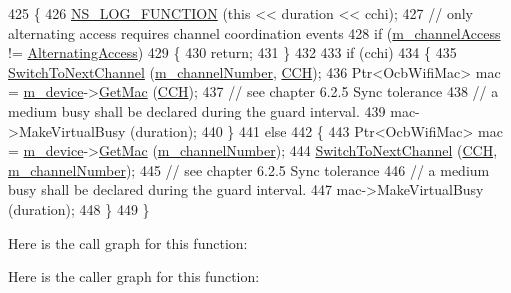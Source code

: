 \begin{DoxyCode}
425 \{
426   \hyperlink{log-macros-disabled_8h_a90b90d5bad1f39cb1b64923ea94c0761}{NS\_LOG\_FUNCTION} (\textcolor{keyword}{this} << duration << cchi);
427   \textcolor{comment}{// only alternating access requires channel coordination events}
428   \textcolor{keywordflow}{if} (\hyperlink{classns3_1_1DefaultChannelScheduler_a1316c42b27cfd480a0a2bf4f949f0402}{m\_channelAccess} != \hyperlink{namespacens3_a877f2f8d3767cc34993bce0739179781a5b36d54e91da429a2e16406e0eacb3a2}{AlternatingAccess})
429     \{
430       \textcolor{keywordflow}{return};
431     \}
432 
433   \textcolor{keywordflow}{if} (cchi)
434     \{
435       \hyperlink{classns3_1_1DefaultChannelScheduler_a661fb5bfff90527fa4be59820ccf8bdf}{SwitchToNextChannel} (\hyperlink{classns3_1_1DefaultChannelScheduler_ade2b5b6a517ae8cfaf6c476c422d0d41}{m\_channelNumber}, 
      \hyperlink{channel-manager_8h_a52d2f169cde2f6abe66ecc83f0d7ad80}{CCH});
436       Ptr<OcbWifiMac> mac = \hyperlink{classns3_1_1ChannelScheduler_ac3d6c3071b8c796afb73789844968405}{m\_device}->\hyperlink{classns3_1_1WaveNetDevice_a899f670dd8eb023f0e40f19b536724eb}{GetMac} (\hyperlink{channel-manager_8h_a52d2f169cde2f6abe66ecc83f0d7ad80}{CCH});
437       \textcolor{comment}{// see chapter 6.2.5 Sync tolerance}
438       \textcolor{comment}{// a medium busy shall be declared during the guard interval.}
439       mac->MakeVirtualBusy (duration);
440     \}
441   \textcolor{keywordflow}{else}
442     \{
443       Ptr<OcbWifiMac> mac = \hyperlink{classns3_1_1ChannelScheduler_ac3d6c3071b8c796afb73789844968405}{m\_device}->\hyperlink{classns3_1_1WaveNetDevice_a899f670dd8eb023f0e40f19b536724eb}{GetMac} (\hyperlink{classns3_1_1DefaultChannelScheduler_ade2b5b6a517ae8cfaf6c476c422d0d41}{m\_channelNumber});
444       \hyperlink{classns3_1_1DefaultChannelScheduler_a661fb5bfff90527fa4be59820ccf8bdf}{SwitchToNextChannel} (\hyperlink{channel-manager_8h_a52d2f169cde2f6abe66ecc83f0d7ad80}{CCH}, \hyperlink{classns3_1_1DefaultChannelScheduler_ade2b5b6a517ae8cfaf6c476c422d0d41}{m\_channelNumber});
445       \textcolor{comment}{// see chapter 6.2.5 Sync tolerance}
446       \textcolor{comment}{// a medium busy shall be declared during the guard interval.}
447       mac->MakeVirtualBusy (duration);
448     \}
449 \}
\end{DoxyCode}


Here is the call graph for this function\+:




Here is the caller graph for this function\+:


